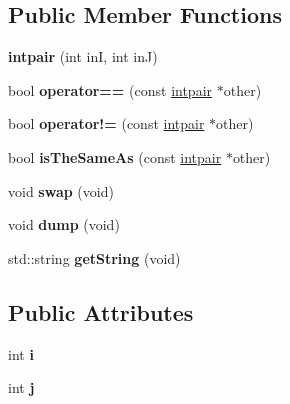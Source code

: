 \subsection*{Public Member Functions}
\begin{DoxyCompactItemize}
\item 
{\bfseries intpair} (int inI, int inJ)\hypertarget{classintpair_ae531dd74d1f423a9ab00daee87f12ae0}{}\label{classintpair_ae531dd74d1f423a9ab00daee87f12ae0}

\item 
bool {\bfseries operator==} (const \hyperlink{classintpair}{intpair} $\ast$other)\hypertarget{classintpair_a652eac052b6323217efa7a40ead6184c}{}\label{classintpair_a652eac052b6323217efa7a40ead6184c}

\item 
bool {\bfseries operator!=} (const \hyperlink{classintpair}{intpair} $\ast$other)\hypertarget{classintpair_ae6d12c36f8eb9ceebbddcb89f3f1a98f}{}\label{classintpair_ae6d12c36f8eb9ceebbddcb89f3f1a98f}

\item 
bool {\bfseries is\+The\+Same\+As} (const \hyperlink{classintpair}{intpair} $\ast$other)\hypertarget{classintpair_a3580e37813128bfaf6a3df75bc379ba1}{}\label{classintpair_a3580e37813128bfaf6a3df75bc379ba1}

\item 
void {\bfseries swap} (void)\hypertarget{classintpair_a48e17868168d8f0d5dafd6234ae0f357}{}\label{classintpair_a48e17868168d8f0d5dafd6234ae0f357}

\item 
void {\bfseries dump} (void)\hypertarget{classintpair_a293807486458b365cfc44d68cd0c3577}{}\label{classintpair_a293807486458b365cfc44d68cd0c3577}

\item 
std\+::string {\bfseries get\+String} (void)\hypertarget{classintpair_a52590ac26c591ca5970c65aeabf46f50}{}\label{classintpair_a52590ac26c591ca5970c65aeabf46f50}

\end{DoxyCompactItemize}
\subsection*{Public Attributes}
\begin{DoxyCompactItemize}
\item 
int {\bfseries i}\hypertarget{classintpair_accfc85d2e86a853047c938ffe980e5cc}{}\label{classintpair_accfc85d2e86a853047c938ffe980e5cc}

\item 
int {\bfseries j}\hypertarget{classintpair_a631aa0b024f4050f8641a532ab169a56}{}\label{classintpair_a631aa0b024f4050f8641a532ab169a56}

\end{DoxyCompactItemize}


